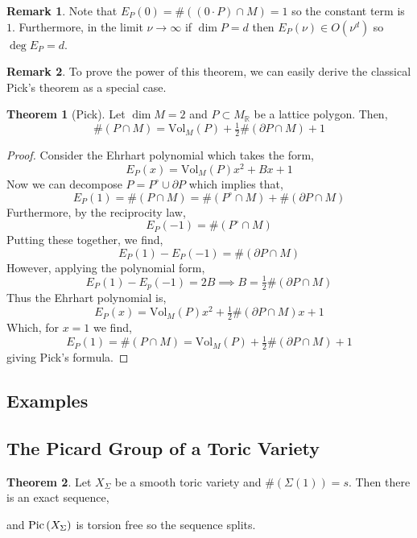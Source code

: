 \documentclass[12pt]{extarticle}
\newcommand{\Z}{\mathbb{Z}}
\newcommand{\R}{\mathbb{R}}
\theoremstyle{definition}
\newtheorem{theorem}{Theorem}[section]
\newtheorem{remark}{Remark}
\newcommand{\Vol}[2]{\mathrm{Vol}_{#1}\left( #2 \right)}
\begin{document}
\begin{remark}
Note that $E_P(0) = \#((0 \cdot P) \cap M) = 1$ so the constant term is $1$. Furthermore, in the limit $\nu \to \infty$ if $\dim{P} = d$ then $E_P(\nu) \in O(\nu^d)$ so $\deg{E_P} = d$.  
\end{remark}

\begin{remark}
To prove the power of this theorem, we can easily derive the classical Pick's theorem as a special case.
\end{remark}

\begin{theorem}[Pick]
Let $\dim{M} = 2$ and $P \subset M_\R$ be a lattice polygon. Then,
\[ \# (P \cap M) = \Vol{M}{P} + \tfrac{1}{2} \# (\partial P \cap M) + 1 \] 
\end{theorem}

\begin{proof}
Consider the Ehrhart polynomial which takes the form,
\[ E_P(x) = \Vol{M}{P} x^2 + B x + 1 \]
Now we can decompose $P = P^\circ \cup \partial P$ which implies that,
\[ E_P(1) = \# \left( P \cap M \right) = \# \left( P^\circ \cap M \right) + \# \left( \partial P \cap M \right) \]
Furthermore, by the reciprocity law,
\[ E_P(-1) = \# \left( P^\circ \cap M \right) \]
Putting these together, we find,
\[ E_P(1) - E_P(-1) = \# \left( \partial P \cap M \right) \]
However, applying the polynomial form,
\[ E_P(1) - E_p(-1) = 2 B \implies B = \tfrac{1}{2} \# \left( \partial P \cap M \right) \]
Thus the Ehrhart polynomial is,
\[ E_P(x) = \Vol{M}{P} x^2 + \tfrac{1}{2} \# \left( \partial P \cap M \right) x + 1 \]
Which, for $x = 1$ we find,
\[ E_P(1) = \# \left( P \cap M \right) = \Vol{M}{P} + \tfrac{1}{2} \# \left( \partial P \cap M \right)  + 1 \]
giving Pick's formula. 
\end{proof}

\subsection{Examples}


\subsection{The Picard Group of a Toric Variety}

\begin{theorem}
Let $X_\Sigma$ be a smooth toric variety and $\#(\Sigma(1)) = s$. Then there is an exact sequence,
\begin{center}
\end{center}
and $\mathrm{Pic}\left( X_\Sigma \right)$ is torsion free so the sequence splits. 
\end{theorem}
\end{document}
